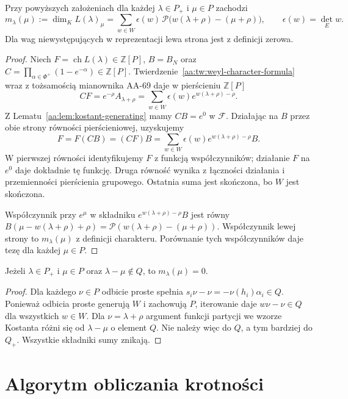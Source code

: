 \begin{twierdzenie}
\label{aa:tw:kostant-multiplicity}
Przy powyższych założeniach dla każdej $\lambda\in P_+$ i $\mu\in P$ zachodzi
\[
 m_\lambda(\mu):=\dim_K L(\lambda)_\mu
 =\sum_{w\in W}\epsilon(w)\,
 \mathcal P\bigl(w(\lambda+\rho)-(\mu+\rho)\bigr),
 \qquad \epsilon(w)=\det_E w.
\]
Dla wag niewystępujących w reprezentacji lewa strona jest z definicji zerowa.
\end{twierdzenie}
\begin{proof}
Niech $F=\operatorname{ch}L(\lambda)\in\mathbb Z[P]$, $B=B_N$ oraz $C=\prod_{\alpha\in\Phi^+}(1-e^{-\alpha})\in\mathbb Z[P]$. Twierdzenie~\ref{aa:tw:weyl-character-formula} wraz z tożsamością mianownika AA-69 daje w pierścieniu $\mathbb Z[P]$
\[
 CF=e^{-\rho}A_{\lambda+\rho}
   =\sum_{w\in W}\epsilon(w)e^{w(\lambda+\rho)-\rho}.
\]
Z Lematu~\ref{aa:lem:kostant-generating} mamy $CB=e^0$ w $\mathcal F$. Działając na $B$ przez obie strony równości pierścieniowej, uzyskujemy
\[
 F=F(CB)=(CF)B
   =\sum_{w\in W}\epsilon(w)e^{w(\lambda+\rho)-\rho}B.
\]
W pierwszej równości identyfikujemy $F$ z funkcją współczynników; działanie $F$ na $e^0$ daje dokładnie tę funkcję. Druga równość wynika z łączności działania i przemienności pierścienia grupowego. Ostatnia suma jest skończona, bo $W$ jest skończona.

Współczynnik przy $e^\mu$ w składniku $e^{w(\lambda+\rho)-\rho}B$ jest równy
$B(\mu-w(\lambda+\rho)+\rho)=
\mathcal P(w(\lambda+\rho)-(\mu+\rho))$.
Współczynnik lewej strony to $m_\lambda(\mu)$ z definicji charakteru. Porównanie tych współczynników daje tezę dla każdej $\mu\in P$.
\end{proof}

\begin{wniosek}
\label{aa:cor:kostant-coset}
Jeżeli $\lambda\in P_+$ i $\mu\in P$ oraz $\lambda-\mu\notin Q$, to $m_\lambda(\mu)=0$.
\end{wniosek}
\begin{proof}
Dla każdego $\nu\in P$ odbicie proste spełnia
$s_i\nu-\nu=-\nu(h_i)\alpha_i\in Q$. Ponieważ odbicia proste generują $W$ i zachowują $P$, iterowanie daje $w\nu-\nu\in Q$ dla wszystkich $w\in W$. Dla $\nu=\lambda+\rho$ argument funkcji partycji we wzorze Kostanta różni się od $\lambda-\mu$ o element $Q$. Nie należy więc do $Q$, a tym bardziej do $Q_+$. Wszystkie składniki sumy znikają.
\end{proof}

\section{Algorytm obliczania krotności}

